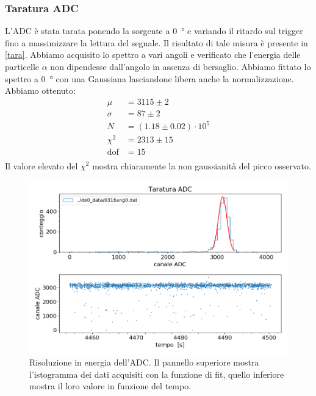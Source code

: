 \subsubsection{Taratura ADC}
L'ADC è stata tarata ponendo la sorgente a \SI{0}{\degree} e variando il ritardo sul trigger fino a massimizzare la lettura del segnale. Il risultato di tale misura è presente in \autoref{tara}. Abbiamo acquisito lo spettro a vari angoli e verificato che l'energia delle particelle $\alpha$ non dipendesse dall'angolo in assenza di bersaglio. 
Abbiamo fittato lo spettro a \SI{0}{\degree} con una Gaussiana lasciandone libera anche la normalizzazione.\\
Abbiamo ottenuto:
\begin{align*}
\mu &=3115\pm2 \\
\sigma &= 87\pm2 \\
N &=(1.18\pm0.02)\cdot10^5 \\
\chi^2 &=2313\pm15 \\
\text{dof} &=15 \\
\end{align*}
Il valore elevato del $\chi^2$ mostra chiaramente la non gaussianità del picco osservato.

\begin{figure}[h]
\centering
\includegraphics[width=23 em]{immagini/cal_provv}
\caption{Risoluzione in energia dell'ADC. Il pannello superiore mostra l'istogramma dei dati acquisiti con la funzione di fit, quello inferiore mostra il loro valore in funzione del tempo.}
\label{tara}
\end{figure}